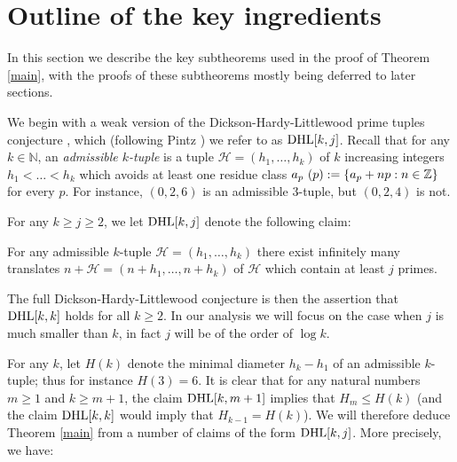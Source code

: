
\section{Outline of the key ingredients}\label{subclaim-sec}

In this section we describe the key subtheorems used in the proof of Theorem \ref{main}, with the proofs of these subtheorems mostly being deferred to later sections.

We begin with a weak version of the Dickson-Hardy-Littlewood prime tuples conjecture \cite{hardy}, which (following Pintz \cite{pintz-polignac}) we refer to as $\operatorname*{DHL}[k,j]$.  Recall that for any $k \in \mathbb{N}$, an \emph{admissible $k$-tuple} is a tuple ${\mathcal H} = (h_1,\ldots,h_{k})$ of $k$ increasing integers $h_1 < \ldots < h_{k}$ which avoids at least one residue class $a_p\ (p) := \{ a_p + np: n \in \Z \}$ for every $p$.  For instance, $(0,2,6)$ is an admissible $3$-tuple, but $(0,2,4)$ is not.

For any $k \geq j \geq 2$, we let $\operatorname*{DHL}[k,j]$ denote the following claim:

\begin{claim} For any admissible $k$-tuple ${\mathcal
    H}=(h_1,\ldots,h_{k})$ there
  exist infinitely many translates $n + {\mathcal H} =
  (n+h_1,\ldots,n+h_{k})$ of ${\mathcal H}$ which contain at least $j$
  primes.
\end{claim}

The full Dickson-Hardy-Littlewood conjecture is then the assertion that $\operatorname*{DHL}[k,k]$ holds for all $k \ge 2$.  In our analysis we will focus on the case when $j$ is much smaller than $k$, in fact $j$ will be of the order of $\log k$.

For any $k$, let $H(k)$ denote the minimal diameter $h_k-h_1$ of an admissible $k$-tuple; thus for instance $H(3)=6$.  It is clear that for any natural numbers $m \geq 1$ and $k \geq m+1$, the claim $\operatorname*{DHL}[k,m+1]$ implies that $H_m \leq H(k)$ (and the claim $\operatorname*{DHL}[k,k]$ would imply that $H_{k-1} = H(k)$).  We will therefore deduce Theorem \ref{main} from a number of claims of the form $\operatorname*{DHL}[k,j]$.  More precisely, we have:

